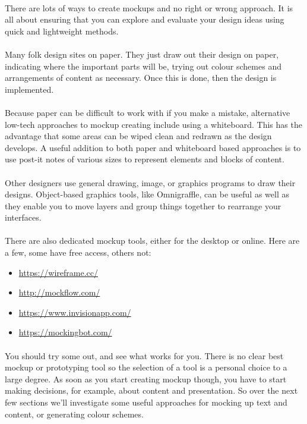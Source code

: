\paragraph{} There are lots of ways to create mockups and no right or wrong approach. It is all about ensuring that you can explore and evaluate your design ideas using quick and lightweight methods.
\paragraph{} Many folk design sites on paper. They just draw out their design on paper, indicating where the important parts will be, trying out colour schemes and arrangements of content as necessary. Once this is done, then the design is implemented.
\paragraph{} Because paper can be difficult to work with if you make a mistake, alternative low-tech approaches to mockup creating include using a whiteboard. This has the advantage that some areas can be wiped clean and redrawn as the design develops. A useful addition to both paper and whiteboard based approaches is to use post-it notes of various sizes to represent elements and blocks of content.
\paragraph{} Other designers use general drawing, image, or graphics programs to draw their designs. Object-based graphics tools, like Omnigraffle, can be useful as well as they enable you to move layers and group things together to rearrange your interfaces.
\paragraph{} There are also dedicated mockup tools, either for the desktop or online. Here are a few, some have free access, others not:

\begin{itemize}
    \item \url{https://wireframe.cc/}
	\item \url{http://mockflow.com/}
	\item \url{https://www.invisionapp.com/}
	\item \url{https://mockingbot.com/}
\end{itemize}

\paragraph{} You should try some out, and see what works for you. There is no clear best mockup or prototyping tool so the selection of a tool is a personal choice to a large degree. As soon as you start creating mockup though, you have to start making decisions, for example, about content and presentation. So over the next few sections we'll investigate some useful approaches for mocking up text and content, or generating colour schemes.



